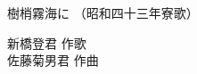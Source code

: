 \documentclass[10pt,b5j]{tarticle} %
\begin{document}
\begin{minipage}[c]{0.7\hsize} %
    \begin{center}
        {\LARGE
            樹梢霧海に %
        }
        {\small 
            （昭和四十三年寮歌） %
        }
    \end{center}
\end{minipage}
\begin{minipage}[c]{0.3\hsize} %
    \begin{flushright} %
        新橋登君 作歌\\佐藤菊男君 作曲 %
    \end{flushright}
\end{minipage}
\end{document}
